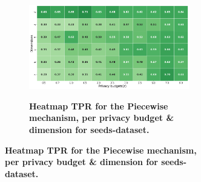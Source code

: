 \begin{figure}[H]
\begin{subfigure}[b]{0.9\textwidth}
        \begin{subfigure}[c]{1\textwidth}
            \caption{\textbf{Heatmap TPR for the Piecewise mechanism, per privacy budget \& dimension for seeds-dataset.}}
            \includegraphics[width=1\textwidth]{Results/kd-laplace/piecewise/seeds-dataset/tpr.png}
            \label{fig:privacy_tpr_seeds-dataset_adversial_advantage_piecewise}
        \end{subfigure}
    \end{subfigure}
    \hfill %
    \begin{subfigure}[b]{0.075\textwidth}

\end{subfigure}
\end{figure}
